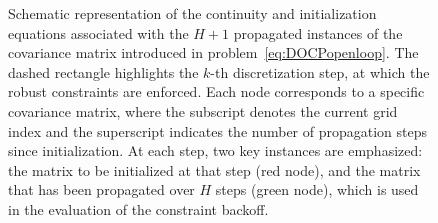 {\begin{figure}
	\caption{Schematic representation of the continuity and initialization equations associated with the $H+1$ propagated instances of the covariance matrix introduced in problem~\eqref{eq:DOCPopenloop}. The dashed rectangle highlights the $k$-th discretization step, at which the robust constraints are enforced. Each node corresponds to a specific covariance matrix, where the subscript denotes the current grid index and the superscript indicates the number of propagation steps since initialization. At each step, two key instances are emphasized: the matrix to be initialized at that step (red node), and the matrix that has been propagated over $H$ steps (green node), which is used in the evaluation of the constraint backoff.}
	\label{fig:DOCPgrid}
\end{figure}
}{}

